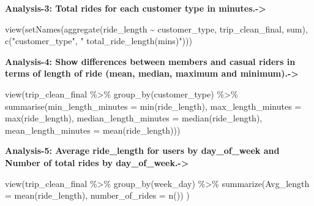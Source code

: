 \documentclass[
]{article}
\newenvironment{Shaded}{\begin{snugshade}}{\end{snugshade}}
\newcommand{\AttributeTok}[1]{\textcolor[rgb]{0.77,0.63,0.00}{#1}}
\newcommand{\FunctionTok}[1]{\textcolor[rgb]{0.00,0.00,0.00}{#1}}
\newcommand{\NormalTok}[1]{#1}
\newcommand{\SpecialCharTok}[1]{\textcolor[rgb]{0.00,0.00,0.00}{#1}}
\newcommand{\StringTok}[1]{\textcolor[rgb]{0.31,0.60,0.02}{#1}}
\begin{document}
\textbf{Analysis-3: Total rides for each customer type in
minutes.-\textgreater{}}

\begin{Shaded}
\begin{Highlighting}[]
\FunctionTok{view}\NormalTok{(}\FunctionTok{setNames}\NormalTok{(}\FunctionTok{aggregate}\NormalTok{(ride\_length }\SpecialCharTok{\textasciitilde{}}\NormalTok{ customer\_type, trip\_clean\_final, sum), }
              \FunctionTok{c}\NormalTok{(}\StringTok{"customer\_type"}\NormalTok{, }\StringTok{" total\_ride\_length(mins)"}\NormalTok{)))}
\end{Highlighting}
\end{Shaded}

\textbf{Analysis-4: Show differences between members and casual riders
in terms of length of ride (mean, median, maximum and
minimum).-\textgreater{}}

\begin{Shaded}
\begin{Highlighting}[]
\FunctionTok{view}\NormalTok{(trip\_clean\_final }\SpecialCharTok{\%\textgreater{}\%} 
       \FunctionTok{group\_by}\NormalTok{(customer\_type) }\SpecialCharTok{\%\textgreater{}\%} 
       \FunctionTok{summarise}\NormalTok{(}\AttributeTok{min\_length\_minutes =} \FunctionTok{min}\NormalTok{(ride\_length), }\AttributeTok{max\_length\_minutes =} \FunctionTok{max}\NormalTok{(ride\_length), }
                 \AttributeTok{median\_length\_minutes =} \FunctionTok{median}\NormalTok{(ride\_length), }\AttributeTok{mean\_length\_minutes =} \FunctionTok{mean}\NormalTok{(ride\_length)))}
\end{Highlighting}
\end{Shaded}

\textbf{Analysis-5: Average ride\_length for users by day\_of\_week and
Number of total rides by day\_of\_week.-\textgreater{}}

\begin{Shaded}
\begin{Highlighting}[]
\FunctionTok{view}\NormalTok{(trip\_clean\_final }\SpecialCharTok{\%\textgreater{}\%} 
       \FunctionTok{group\_by}\NormalTok{(week\_day) }\SpecialCharTok{\%\textgreater{}\%} 
       \FunctionTok{summarize}\NormalTok{(}\AttributeTok{Avg\_length =} \FunctionTok{mean}\NormalTok{(ride\_length),}
                 \AttributeTok{number\_of\_rides =} \FunctionTok{n}\NormalTok{())}
\NormalTok{     )}
\end{Highlighting}
\end{Shaded}
\end{document}
